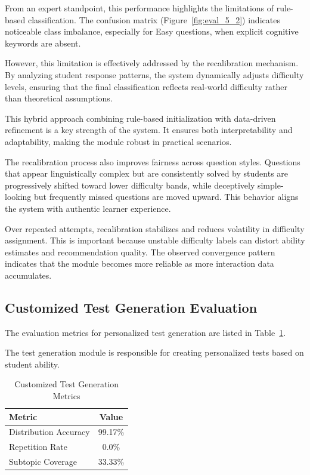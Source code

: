 \begin{sloppypar}
From an expert standpoint, this performance highlights the limitations of rule-based classification. The confusion matrix (Figure~\ref{fig:eval_5_2}) indicates noticeable class imbalance, especially for Easy questions, when explicit cognitive keywords are absent.

However, this limitation is effectively addressed by the recalibration mechanism. By analyzing student response patterns, the system dynamically adjusts difficulty levels, ensuring that the final classification reflects real-world difficulty rather than theoretical assumptions.

This hybrid approach combining rule-based initialization with data-driven refinement is a key strength of the system. It ensures both interpretability and adaptability, making the module robust in practical scenarios.

The recalibration process also improves fairness across question styles. Questions that appear linguistically complex but are consistently solved by students are progressively shifted toward lower difficulty bands, while deceptively simple-looking but frequently missed questions are moved upward. This behavior aligns the system with authentic learner experience.

Over repeated attempts, recalibration stabilizes and reduces volatility in difficulty assignment. This is important because unstable difficulty labels can distort ability estimates and recommendation quality. The observed convergence pattern indicates that the module becomes more reliable as more interaction data accumulates.

\subsection{Customized Test Generation Evaluation}

The evaluation metrics for personalized test generation are listed in Table~\ref{tab:test_generation_metrics}.

The test generation module is responsible for creating personalized tests based on student ability.

\begin{table}[H]
\centering
\caption{Customized Test Generation Metrics}
\label{tab:test_generation_metrics}
\begin{tabular}{|l|c|}
\hline
Metric & Value \\
\hline
Distribution Accuracy & 99.17\% \\
\hline
Repetition Rate & 0.0\% \\
\hline
Subtopic Coverage & 33.33\% \\
\hline
\end{tabular}
\end{table}


\end{sloppypar}
